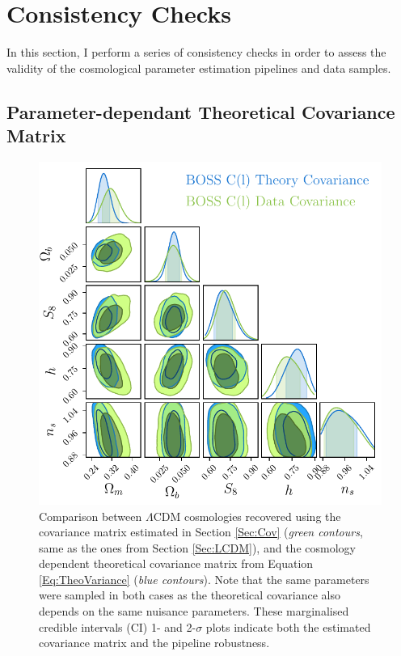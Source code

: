 \section{Consistency Checks}
In this section, I perform a series of consistency checks in order to assess the validity of the cosmological parameter estimation pipelines and data samples. 

\subsection{Parameter-dependant Theoretical Covariance Matrix}
\begin{figure}
\begin{center}
\includegraphics[scale=0.75]{BOSS-FIGS/theoryCovContours.pdf}
\caption[Comparison between $\Lambda$CDM cosmologies recovered using the covariance matrix estimated in Section \ref{Sec:Cov}and the cosmology dependent theoretical covariance matrix from Equation \eqref{Eq:TheoVariance}.]{Comparison between $\Lambda$CDM cosmologies recovered using the covariance matrix estimated in Section \ref{Sec:Cov} (\textit{green contours}, same as the ones from Section \ref{Sec:LCDM}), and the cosmology dependent theoretical covariance matrix from Equation \eqref{Eq:TheoVariance} (\textit{blue contours}). Note that the same parameters were sampled in both cases as the theoretical covariance also depends on the same nuisance parameters. These marginalised credible intervals (CI) 1- and 2-$\sigma$ plots indicate both the estimated covariance matrix and the \uclcl pipeline robustness.}
\label{fig:TheoryCovTriangle}
\end{center}
\end{figure}

